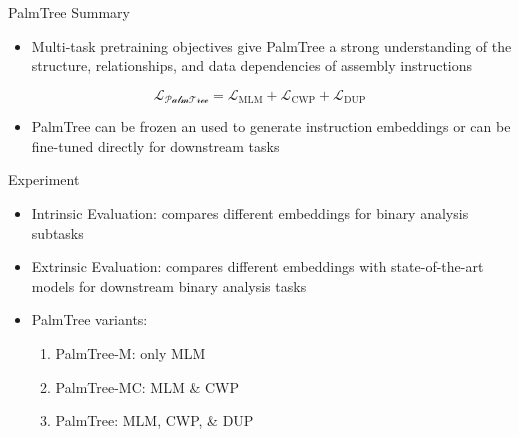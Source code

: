 \documentclass{beamer}
\begin{document}
\begin{frame}{PalmTree Summary}
	
	\begin{itemize}
		\item Multi-task pretraining objectives give PalmTree a strong understanding of the structure, relationships, and data dependencies of assembly instructions
	\end{itemize}

	$$
	\mathcal{L_{\textrm{PalmTree}}} = \mathcal{L}_{\textrm{MLM}} + \mathcal{L}_{\textrm{CWP}} + \mathcal{L}_{\textrm{DUP}}
	$$
	

	\begin{itemize}
		\item PalmTree can be frozen an used to generate instruction embeddings or can be fine-tuned directly for downstream tasks
	\end{itemize}
	
\end{frame}

\begin{frame}{Experiment}
	
	\begin{itemize}
		\item Intrinsic Evaluation: compares different embeddings for binary analysis subtasks
		\item Extrinsic Evaluation: compares different embeddings with state-of-the-art models for downstream binary analysis tasks
		\item PalmTree variants:
		\begin{enumerate}
			\item PalmTree-M: only MLM
			\item PalmTree-MC: MLM \& CWP
			\item PalmTree: MLM, CWP, \& DUP
		\end{enumerate}
	\end{itemize}
	
\end{frame}
\end{document}

